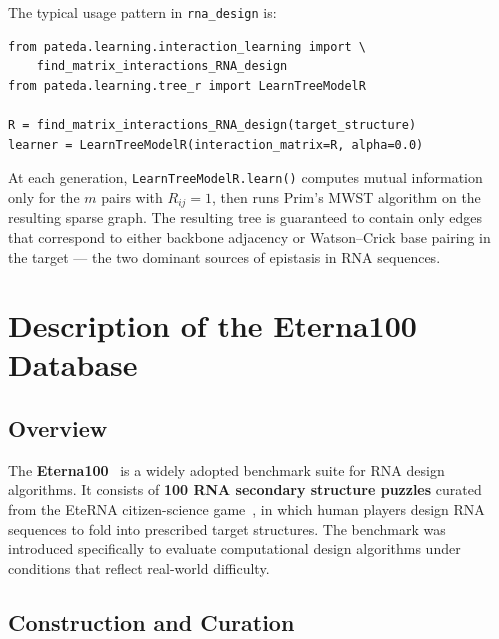 \documentclass[11pt,a4paper]{article}
\begin{document}
The typical usage pattern in \texttt{rna\_design} is:
\begin{center}
\begin{minipage}{0.85\textwidth}
\begin{verbatim}
from pateda.learning.interaction_learning import \
    find_matrix_interactions_RNA_design
from pateda.learning.tree_r import LearnTreeModelR

R = find_matrix_interactions_RNA_design(target_structure)
learner = LearnTreeModelR(interaction_matrix=R, alpha=0.0)
\end{verbatim}
\end{minipage}
\end{center}
At each generation, \texttt{LearnTreeModelR.learn()} computes mutual
information only for the $m$ pairs with $R_{ij}=1$, then runs Prim's
MWST algorithm on the resulting sparse graph. The resulting tree is
guaranteed to contain only edges that correspond to either backbone
adjacency or Watson--Crick base pairing in the target — the two
dominant sources of epistasis in RNA sequences.

\section{Description of the Eterna100 Database}
\label{sec:eterna}

\subsection{Overview}

The \textbf{Eterna100}~\cite{lee2014eterna, anderson2016eterna} is a widely
adopted benchmark suite for RNA design algorithms. It consists of
\textbf{100 RNA secondary structure puzzles} curated from the EteRNA
citizen-science game~\cite{das2010eterna}, in which human players design
RNA sequences to fold into prescribed target structures. The benchmark was
introduced specifically to evaluate computational design algorithms under
conditions that reflect real-world difficulty.

\subsection{Construction and Curation}
\end{document}

